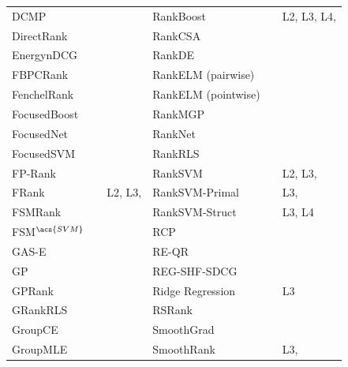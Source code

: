 \begin{table}[!h!p]
{\begin{tabular}{|l|l|l||l|l|l|}
DCMP & \cite{Renjifo2012}  & \cite{Renjifo2012}  & RankBoost & \cite{Freund2003} & L2, L3, L4, \cite{Busa-Fekete2013, Alcantara2010} \\ 
DirectRank & \cite{Tan2013} & \cite{Tan2013} & RankCSA & \cite{He2010} & \cite{He2010} \\ 
Energy\acs{nDCG} & \cite{Freno2011} & \cite{Freno2011} & RankDE & \cite{Bollegala2011} & \cite{Sato2013} \\ 
FBPCRank & \cite{Lai2011} & \cite{Lai2011} & RankELM (pairwise) & \cite{Zong2013} & \cite{Zong2013} \\ 
FenchelRank & \cite{Lai2013} & \cite{Lai2013, Lai2013b, Laporte2013} & RankELM (pointwise) & \cite{Zong2013} & \cite{Zong2013} \\ 
FocusedBoost & \cite{Niu2012} & \cite{Niu2012} & RankMGP & \cite{Lin2012} & \cite{Lin2012} \\ 
FocusedNet & \cite{Niu2012} & \cite{Niu2012} & RankNet & \cite{Burges2005} & \cite{Busa-Fekete2013, Papini2012, Niu2012} \\ 
Focused\acs{SVM} & \cite{Niu2012} & \cite{Niu2012} & Rank\acs{RLS} & \cite{Pahikkala2009} & \cite{Pahikkala2010} \\ 
FP-Rank & \cite{Song2013} & \cite{Song2013} & Rank\acs{SVM} & \cite{Herbrich1999, Joachims2002} & L2, L3, \cite{Busa-Fekete2013, Freno2011, He2010, Alcantara2010} \\ 
FRank & \cite{Tsai2007} & L2, L3, \cite{Wang2012} & Rank\acs{SVM}-Primal &  & L3, \cite{Lai2011} \\ 
FSMRank & \cite{Lai2013c} & \cite{Lai2013c,Laporte2013} & Rank\acs{SVM}-Struct &  & L3, L4 \\
FSM$^{\acs{SVM}}$ & \cite{Lai2013c} & \cite{Lai2013c} & RCP & \cite{Elsas2008} & \cite{Elsas2008} \\ 
GAS-E & \cite{Geng2007} & \cite{Lai2013c} & RE-QR & \cite{Veloso2010} & \cite{Veloso2010} \\
\acs{GP} & \cite{DeAlmeida2007} & \cite{Alcantara2010} & REG-SHF-SDCG & \cite{Wu2009} & \cite{Wu2009} \\  
\acs{GP}Rank & \cite{Silva2009} & \cite{Torkestani2012} & Ridge Regression & \cite{Cossock2006} & L3 \\
GRank\acs{RLS} & \cite{Pahikkala2010} & \cite{Pahikkala2010} & RSRank & \cite{Sun2009} & \cite{Lai2013} \\ 
Group\acs{CE} & \cite{Lin2011} & \cite{Lin2011} & SmoothGrad & \cite{Le2007} & \cite{Tan2013} \\ 
Group\acs{MLE} & \cite{Lin2010} & \cite{Lin2011} & SmoothRank & \cite{Chapelle2010} & L3, \cite{Chapelle2010} \\

\end{tabular}}
\end{table}
